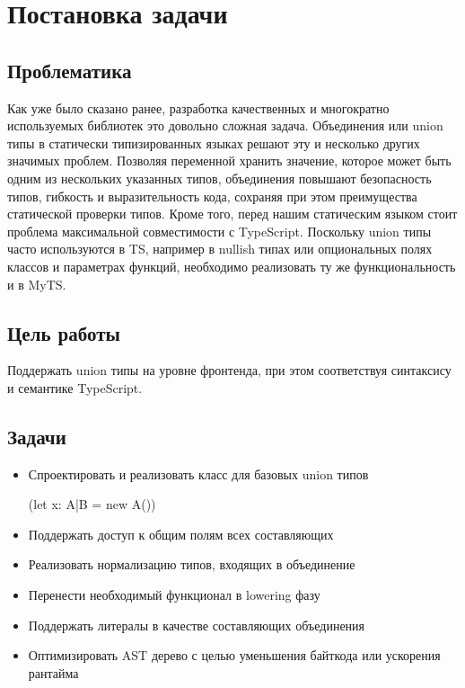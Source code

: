 \section{Постановка задачи}
\label{sec:Chapter1} 

\subsection{Проблематика}

Как уже было сказано ранее, разработка качественных и многократно используемых библиотек это довольно сложная задача.
Объединения или union типы в статически типизированных языках решают эту и несколько других значимых проблем.
Позволяя переменной хранить значение, которое может быть одним из нескольких указанных типов, объединения повышают
безопасность типов, гибкость и выразительность кода, сохраняя при этом преимущества статической проверки типов.
Кроме того, перед нашим статическим языком стоит проблема максимальной совместимости с TypeScript.
Поскольку union типы часто используются в TS, например в nullish типах или опциональных полях классов и параметрах
функций, необходимо реализовать ту же функциональность и в MyTS.

\subsection{Цель работы}

Поддержать union типы на уровне фронтенда, при этом соответствуя синтаксису и семантике TypeScript.

\subsection{Задачи}

\begin{itemize}[left=2em]
    \item Спроектировать и реализовать класс для базовых union типов

    (let x: A|B = new A())
    \item Поддержать доступ к общим полям всех составляющих
    \item Реализовать нормализацию типов, входящих в объединение
    \item Перенести необходимый функционал в lowering фазу
    \item Поддержать литералы в качестве составляющих объединения
    \item Оптимизировать AST дерево с целью уменьшения байткода или ускорения рантайма
\end{itemize}

